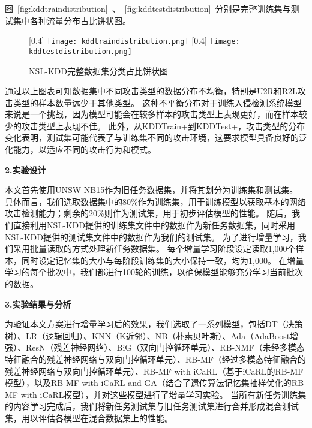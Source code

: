 图~\ref{fig:kddtraindistribution}~、~\ref{fig:kddtestdistribution}~分别是完整训练集与测试集中各种流量分布占比饼状图。
\begin{figure}[htbp]
	\centering
	[0.4\textwidth]{
		\texttt{[image: kddtraindistribution.png]}
	}
	\hspace{36pt}
	[0.4\textwidth]{
		\texttt{[image: kddtestdistribution.png]}
	}
	\caption{NSL-KDD完整数据集分类占比饼状图}
\end{figure}

通过以上图表可知数据集中不同攻击类型的数据分布不均衡，特别是U2R和R2L攻击类型的样本数量远少于其他类型。
这种不平衡分布对于训练入侵检测系统模型来说是一个挑战，因为模型可能会在较多样本的攻击类型上表现更好，而在样本较少的攻击类型上表现不佳。
此外，从KDDTrain+到KDDTest+，攻击类型的分布变化表明，测试集可能代表了与训练集不同的攻击环境，这要求模型具备良好的泛化能力，以适应不同的攻击行为和模式。\par

\textbf{2.实验设计}\par
本文首先使用UNSW-NB15作为旧任务数据集，并将其划分为训练集和测试集。
具体而言，我们选取数据集中的80\%作为训练集，用于训练模型以获取基本的网络攻击检测能力；剩余的20\%则作为测试集，用于初步评估模型的性能。
随后，我们直接利用NSL-KDD提供的训练集文件中的数据作为新任务数据集，同时采用NSL-KDD提供的测试集文件中的数据作为我们的测试集。
为了进行增量学习，我们采用批量读取的方式处理新任务数据集。
每个增量学习阶段设定读取1,000个样本，同时设定记忆集的大小与每阶段训练集的大小保持一致，均为1,000。
在增量学习的每个批次中，我们都进行100轮的训练，以确保模型能够充分学习当前批次的数据。\par

\textbf{3.实验结果与分析}\par
为验证本文方案进行增量学习后的效果，我们选取了一系列模型，包括DT（决策树）、LR（逻辑回归）、KNN（K近邻）、NB（朴素贝叶斯）、Ada（AdaBoost增强）、ResN（残差神经网络）、BiG（双向门控循环单元）、RB-NMF（未经多模态特征融合的残差神经网络与双向门控循环单元）、RB-MF（经过多模态特征融合的残差神经网络与双向门控循环单元）、RB-MF with iCaRL（基于iCaRL的RB-MF模型），以及RB-MF with iCaRL and GA（结合了遗传算法记忆集抽样优化的RB-MF with iCaRL模型），并对这些模型进行了增量学习实验。
当所有新任务训练集的内容学习完成后，我们将新任务测试集与旧任务测试集进行合并形成混合测试集，用以评估各模型在混合数据集上的性能。\par

